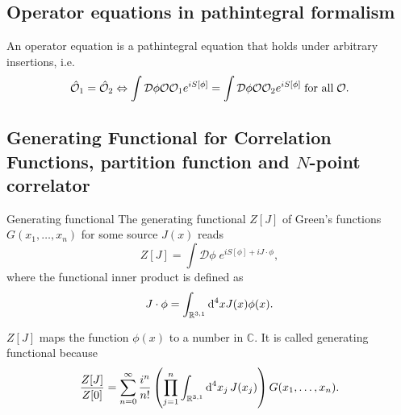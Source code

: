 \subsection{Operator equations in pathintegral formalism}
\begin{mybox}{}
	An operator equation is a pathintegral equation that holds under arbitrary insertions, i.e.
	\begin{equation}
		\hat{ \mathcal{O}}_1 = \hat{\mathcal{O}}_2 \Leftrightarrow \int \mathcal{D}\phi \mathcal{O} \mathcal{O}_1 e^{iS[\phi]} = \int \mathcal{D}\phi \mathcal{O} \mathcal{O}_2 e^{iS[\phi]} \; \text{for all} \; \mathcal{O}.
	\end{equation}
\end{mybox}





\subsection{Generating Functional for Correlation Functions, partition function and $N$-point correlator}
\begin{mybox}{Generating functional}
	The generating functional $Z[J]$ of Green's functions $G(x_1, \dots, x_n)$ for some source $J(x)$ reads
	\begin{equation}
	Z[J] = \int \mathcal{D}\phi \; e^{i S[\phi] + i J \cdot \phi },
	\end{equation}
	where the functional inner product is defined as
	\begin{equation}
	J \cdot \phi = \int_{\mathbb{R}^{3,1}} \mathrm{d}^4 x J(x)\phi(x).
	\end{equation}
\end{mybox}
$Z[J]$ maps the function $\phi(x)$ to a number in $\mathbb{C}$. It is called generating functional because
\begin{equation}
\frac{Z[J]}{Z[0]} = \sum_{n=0}^{\infty} \frac{i^n}{n!} \left(\prod_{j=1}^{n} \int_{\mathbb{R}^{3,1}} \mathrm{d}^4 x_j \, J(x_j) \right)G(x_1,\dots,x_n).
\end{equation}

